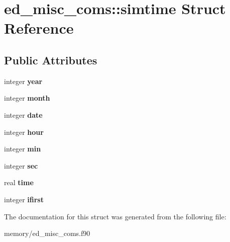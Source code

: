 \hypertarget{structed__misc__coms_1_1simtime}{
\section{ed\_\-misc\_\-coms::simtime Struct Reference}
\label{structed__misc__coms_1_1simtime}
}
\subsection*{Public Attributes}
\begin{DoxyCompactItemize}
\item 
\hypertarget{structed__misc__coms_1_1simtime_aa33c38e2a4be886fb46a0b41fc3614a9}{
integer {\bfseries year}}
\label{structed__misc__coms_1_1simtime_aa33c38e2a4be886fb46a0b41fc3614a9}

\item 
\hypertarget{structed__misc__coms_1_1simtime_ab86b304a048841744f882f3d246b16b4}{
integer {\bfseries month}}
\label{structed__misc__coms_1_1simtime_ab86b304a048841744f882f3d246b16b4}

\item 
\hypertarget{structed__misc__coms_1_1simtime_a59815290d08ac367aeba85374f9fd29e}{
integer {\bfseries date}}
\label{structed__misc__coms_1_1simtime_a59815290d08ac367aeba85374f9fd29e}

\item 
\hypertarget{structed__misc__coms_1_1simtime_a29ae7a915202b4505663d98424170644}{
integer {\bfseries hour}}
\label{structed__misc__coms_1_1simtime_a29ae7a915202b4505663d98424170644}

\item 
\hypertarget{structed__misc__coms_1_1simtime_aa6712664d87da86087d97814e6e6ac18}{
integer {\bfseries min}}
\label{structed__misc__coms_1_1simtime_aa6712664d87da86087d97814e6e6ac18}

\item 
\hypertarget{structed__misc__coms_1_1simtime_ae8e8980c611067383ea98b345220a9ad}{
integer {\bfseries sec}}
\label{structed__misc__coms_1_1simtime_ae8e8980c611067383ea98b345220a9ad}

\item 
\hypertarget{structed__misc__coms_1_1simtime_af1edf430fdbca01a520e8d813d6f769a}{
real {\bfseries time}}
\label{structed__misc__coms_1_1simtime_af1edf430fdbca01a520e8d813d6f769a}

\item 
\hypertarget{structed__misc__coms_1_1simtime_a41401a549e7e7e0b641ca1ee0e1e4664}{
integer {\bfseries ifirst}}
\label{structed__misc__coms_1_1simtime_a41401a549e7e7e0b641ca1ee0e1e4664}

\end{DoxyCompactItemize}


The documentation for this struct was generated from the following file:\begin{DoxyCompactItemize}
\item 
memory/ed\_\-misc\_\-coms.f90\end{DoxyCompactItemize}
